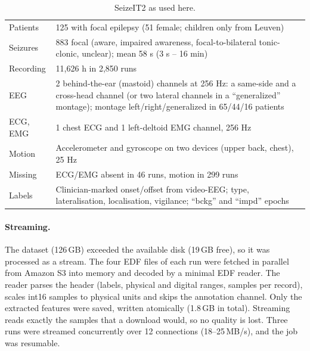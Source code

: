 \begin{table}[htbp]
\centering\small
\caption{SeizeIT2 as used here.}
\label{tab:sz2data}
\begin{tabularx}{\linewidth}{@{}l L@{}}
\toprule
Patients & 125 with focal epilepsy (51 female; children only from Leuven) \\
Seizures & 883 focal (aware, impaired awareness, focal-to-bilateral tonic-clonic, unclear); mean 58 s (3 s -- 16 min) \\
Recording & 11,626 h in 2,850 runs \\
EEG & 2 behind-the-ear (mastoid) channels at 256 Hz: a same-side and a cross-head channel (or two lateral channels in a ``generalized'' montage); montage left/right/generalized in 65/44/16 patients \\
ECG, EMG & 1 chest ECG and 1 left-deltoid EMG channel, 256 Hz \\
Motion & Accelerometer and gyroscope on two devices (upper back, chest), 25 Hz \\
Missing & ECG/EMG absent in 46 runs, motion in 299 runs \\
Labels & Clinician-marked onset/offset from video-EEG; type, lateralisation, localisation, vigilance; ``bckg'' and ``impd'' epochs \\
\bottomrule
\end{tabularx}
\end{table}

\paragraph{Streaming.} The dataset (126\,GB) exceeded the available disk (19\,GB free), so it was processed as a stream. The four EDF files of each run were fetched in parallel from Amazon S3 into memory and decoded by a minimal EDF reader. The reader parses the header (labels, physical and digital ranges, samples per record), scales int16 samples to physical units and skips the annotation channel. Only the extracted features were saved, written atomically (1.8\,GB in total). Streaming reads exactly the samples that a download would, so no quality is lost. Three runs were streamed concurrently over 12 connections (18--25\,MB/s), and the job was resumable.

